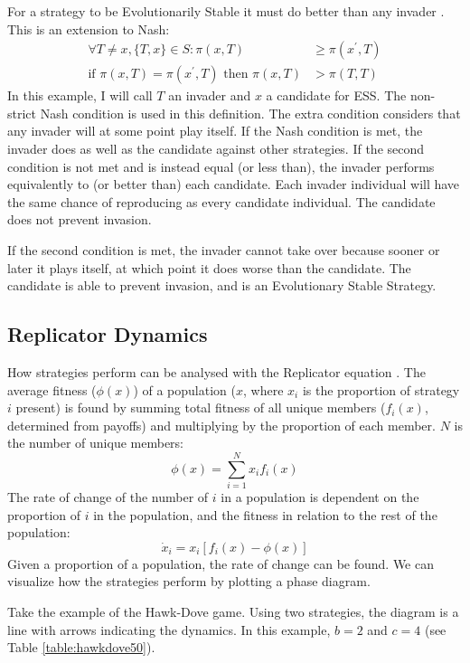 \documentclass[a4paper,11pt,bcshonoursthesis,singlespace,oneside,thesisdraft,pdflatex]{cssethesis}
\begin{document}
For a strategy to be Evolutionarily Stable it must do better than any invader \citep[][ch. 2]{weibull1997evolutionary}. 
This is an extension to Nash:
\begin{align*}
\forall T \neq x, \{T,x\} \in S: \pi(x,T)&\geq \pi(x^\prime,T) \\ 
\text{if } \pi(x,T)=\pi(x^\prime, T)\text{ then }\pi(x, T) &> \pi(T,T)
\end{align*}
In this example, I will call $T$ an invader and $x$ a candidate for ESS. 
The non-strict Nash condition is used in this definition. 
The extra condition considers that any invader will at some point play itself. 
If the Nash condition is met, the invader does as well as the candidate against other strategies. 
If the second condition is not met and is instead equal (or less than), the invader performs equivalently to (or better than) each candidate. Each invader individual will have the same chance of reproducing as every candidate individual. 
The candidate does not prevent invasion. 

If the second condition is met, the invader cannot take over because sooner or later it plays itself, at which point it does worse than the candidate. 
The candidate is able to prevent invasion, and is an Evolutionary Stable Strategy. 

\subsection{Replicator Dynamics}
How strategies perform can be analysed with the Replicator equation \citep{hofbauer1998evolutionary}. 
The average fitness ($\phi(x)$) of a population ($x$, where $x_i$ is the proportion of strategy $i$ present) is found by summing total fitness of all unique members ($f_i(x)$, determined from payoffs) and multiplying by the proportion of each member. $N$ is the number of unique members:
\begin{equation}
\phi(x)=\sum_{i=1}^N x_i f_i(x)
\end{equation}
The rate of change of the number of $i$ in a population is dependent on the proportion of $i$ in the population, and the fitness in relation to the rest of the population:
\begin{equation}
\dot{x}_i=x_i [ f_i(x)-\phi(x)]
\end{equation}
Given a proportion of a population, the rate of change can be found. 
We can visualize how the strategies perform by plotting a phase diagram.  

Take the example of the Hawk-Dove game. Using two strategies, the diagram is a line with arrows indicating the dynamics. In this example, $b=2$ and $c=4$ (see Table \ref{table:hawkdove50}).
\end{document}

